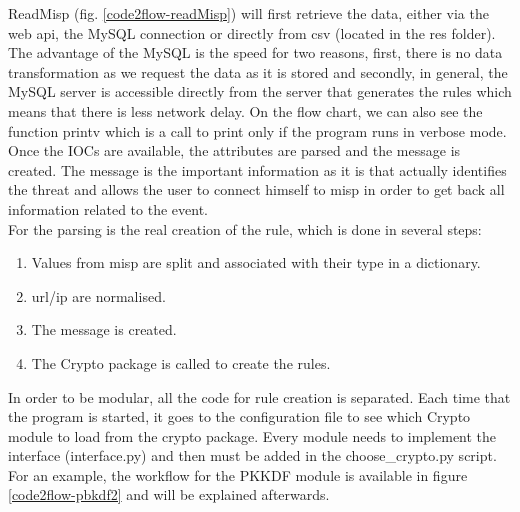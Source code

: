 \documentclass{eplmastersthesis}
\begin{document}
ReadMisp (fig. \ref{code2flow-readMisp}) will first retrieve the data, either via the web \gls{api}, the MySQL connection or directly from \gls{csv} (located in the res folder). The advantage of the MySQL is the speed for two reasons, first, there is no data transformation as we request the data as it is stored and secondly, in general, the MySQL server is accessible directly from the server that generates the rules which means that there is less network delay.
On the flow chart, we can also see the function printv which is a call to print only if the program runs in verbose mode.
Once the IOCs are available, the attributes are parsed and the message is created. The message is the important information as it is that actually identifies the threat and allows the user to connect himself to \gls{misp} in order to get back all information related to the event.\\
For the parsing is the real creation of the rule, which is done in several steps:

\begin{enumerate}
\item Values from \gls{misp} are split and associated with their type in a dictionary.
\item \gls{url}/\gls{ip} are normalised.
\item The message is created.
\item The Crypto package is called to create the rules.
\end{enumerate}

In order to be modular, all the code for rule creation is separated. Each time that the program is started, it goes to the configuration file to see which Crypto module to load from the crypto package.
Every module needs to implement the interface (interface.py) and then must be added in the choose\_crypto.py script.
For an example, the workflow for the PKKDF module is available in figure \ref{code2flow-pbkdf2} and will be explained afterwards.
\end{document}

